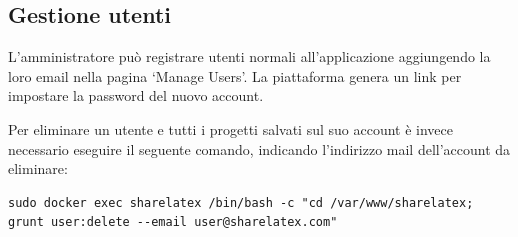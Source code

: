\subsection{Gestione utenti}
L'amministratore può registrare utenti normali all'applicazione aggiungendo la loro email nella pagina \enquote*{Manage Users}. La piattaforma genera un link per impostare la password del nuovo account.

Per eliminare un utente e tutti i progetti salvati sul suo account è invece necessario eseguire il seguente comando, indicando l'indirizzo mail dell'account da eliminare:
\begin{lstlisting}
sudo docker exec sharelatex /bin/bash -c "cd /var/www/sharelatex; grunt user:delete --email user@sharelatex.com"
\end{lstlisting}

